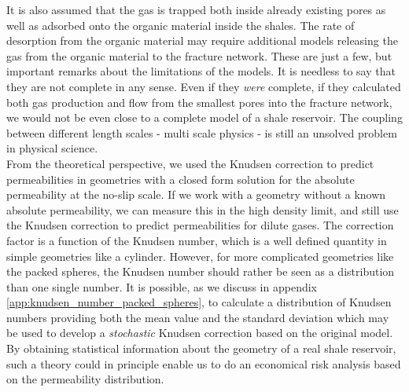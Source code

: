It is also assumed that the gas is trapped both inside already existing pores as well as adsorbed onto the organic material inside the shales. The rate of desorption from the organic material may require additional models releasing the gas from the organic material to the fracture network. These are just a few, but important remarks about the limitations of the models. It is needless to say that they are not complete in any sense. Even if they \textit{were} complete, if they calculated both gas production and flow from the smallest pores into the fracture network, we would not be even close to a complete model of a shale reservoir. The coupling between different length scales - multi scale physics - is still an unsolved problem in physical science.\\
From the theoretical perspective, we used the Knudsen correction to predict permeabilities in geometries with a closed form solution for the absolute permeability at the no-slip scale. If we work with a geometry without a known absolute permeability, we can measure this in the high density limit, and still use the Knudsen correction to predict permeabilities for dilute gases. The correction factor is a function of the Knudsen number, which is a well defined quantity in simple geometries like a cylinder. However, for more complicated geometries like the packed spheres, the Knudsen number should rather be seen as a distribution than one single number. It is possible, as we discuss in appendix \ref{app:knudsen_number_packed_spheres}, to calculate a distribution of Knudsen numbers providing both the mean value and the standard deviation which may be used to develop a \textit{stochastic} Knudsen correction based on the original model. By obtaining statistical information about the geometry of a real shale reservoir, such a theory could in principle enable us to do an economical risk analysis based on the permeability distribution. 